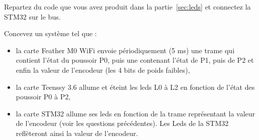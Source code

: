\documentclass[11pt]{paper}
\begin{document}
Repartez du code que vous avez produit dans la partie~\ref{sec:leds} et connectez la STM32 sur le bus.

Concevez un système tel que :
\begin{itemize}
	\item la carte Feather M0 WiFi envoie périodiquement (5 ms) une trame qui contient l'état du poussoir P0, puis une contenant l'état de P1, puis de P2 et enfin la valeur de l'encodeur (les 4 bits de poids faibles),
	\item la carte Teenssy 3.6 allume et éteint les leds L0 à L2 en fonction de l'état des poussoir P0 à P2,
	\item la carte STM32 allume ses leds en fonction de la trame représentant la valeur de l'encodeur (voir les questions précédentes). Les Leds de la STM32 reflèteront ainsi la valeur de l’encodeur.
\end{itemize}
\end{document}
